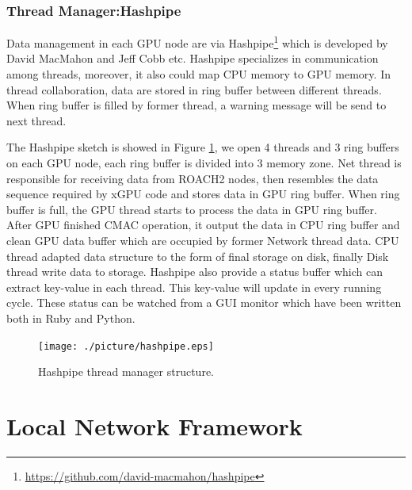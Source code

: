 \documentclass{ws-jai}
\begin{document}
\subsubsection{Thread Manager:Hashpipe}	
	
	Data management in each GPU node are via Hashpipe\footnote{\url{https://github.com/david-macmahon/hashpipe}} which is developed by David MacMahon and Jeff Cobb etc.  Hashpipe specializes in communication among threads, moreover, it also could map CPU memory to GPU memory. In thread collaboration, data are stored in ring buffer between different threads. When ring buffer is filled by former thread, a warning message will be send to next thread. 

	The Hashpipe sketch is showed in Figure \ref{fig:hashpipe}, we open 4 threads and 3 ring buffers on each GPU node, each ring buffer is divided into 3 memory zone. Net thread is responsible for receiving data from  ROACH2 nodes, then resembles the data sequence required by xGPU code and stores data in GPU ring buffer. When ring buffer is full, the GPU thread starts to process the data in GPU ring buffer.  After GPU finished CMAC operation, it output the data in CPU ring buffer and clean GPU data buffer which are occupied by former Network thread data.  CPU thread adapted data structure to the form of final storage on disk, finally Disk thread write data to storage.
	Hashpipe also provide a status buffer which can extract key-value in each thread. This key-value will update in every running cycle. These status can be watched from a GUI monitor which have been written both in Ruby and Python. 
\begin{figure}[t]
 \centering
 \texttt{[image: ./picture/hashpipe.eps]}
\caption{Hashpipe thread manager structure.\label{fig:hashpipe}}
\end{figure}

\section{Local Network Framework \label{sec:Local Network}}
\end{document}
